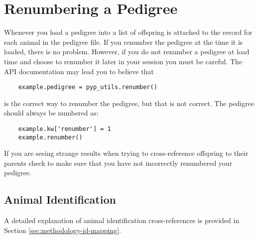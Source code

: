 \section{Renumbering a Pedigree}
\label{sec:renumbering}
Whenever you load a pedigree into \PyPedal{} a list of offspring is attached to the record for each animal in the pedigree file.  If you renumber the pedigree at the time it is loaded, there is no problem.  However, if you do not renumber a pedigree at load time and choose to renumber it later in your session you must be careful.  The API documentation may lead you to believe that
\begin{verbatim}
    example.pedigree = pyp_utils.renumber()
\end{verbatim}
is the correct way to renumber the pedigree, but that is not correct.  The pedigree should always be numbered as:
\begin{verbatim}
    example.kw['renumber'] = 1
    example.renumber()
\end{verbatim}
If you are seeing strange results when trying to cross-reference offspring to their parents check to make sure that you have not incorrectly renumbered your pedigree.
\subsection{Animal Identification}
\label{sec:renumbering-animal-id}
A detailed explanation of animal identification cross-references is provided in Section \ref{sec:methodology-id-mapping}.
